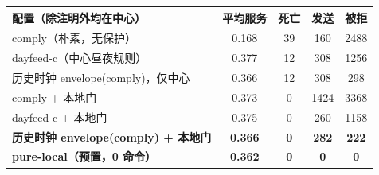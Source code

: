 \begin{tabular}{lcccc}
\toprule
配置（除注明外均在中心） & 平均服务 & 死亡 & 发送 & 被拒\\
\midrule
comply（朴素，无保护） & 0.168 & 39 & 160 & 2488\\
dayfeed-c（中心昼夜规则） & 0.377 & 12 & 308 & 1256\\
历史时钟 envelope(comply)，仅中心 & 0.366 & 12 & 308 & 298\\
comply + 本地门 & 0.373 & 0 & 1424 & 3368\\
dayfeed-c + 本地门 & 0.375 & 0 & 260 & 1158\\
\textbf{历史时钟 envelope(comply) + 本地门} & \textbf{0.366} & \textbf{0} & \textbf{282} & \textbf{222}\\
\midrule
\textbf{pure-local（预置，0 命令）} & \textbf{0.362} & \textbf{0} & \textbf{0} & \textbf{0}\\
\bottomrule
\end{tabular}
